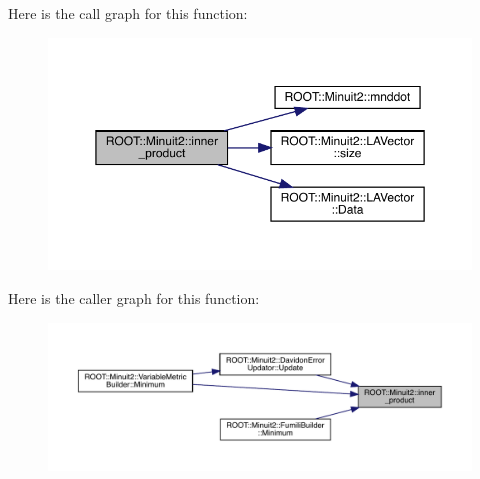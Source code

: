 Here is the call graph for this function\+:\nopagebreak
\begin{figure}[H]
\begin{center}
\leavevmode
\includegraphics[width=350pt]{d6/d3a/namespaceROOT_1_1Minuit2_ac47f2faa5fce723ec08365b174b5035d_cgraph}
\end{center}
\end{figure}
Here is the caller graph for this function\+:\nopagebreak
\begin{figure}[H]
\begin{center}
\leavevmode
\includegraphics[width=350pt]{d6/d3a/namespaceROOT_1_1Minuit2_ac47f2faa5fce723ec08365b174b5035d_icgraph}
\end{center}
\end{figure}
\mbox{\label{namespaceROOT_1_1Minuit2_ad9e57aa2fbebb59a130d5c7cc8df6bd2}} 
